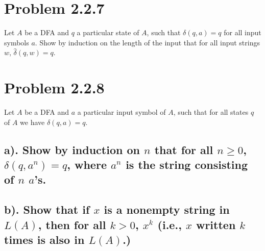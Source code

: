 \documentclass[20pt]{article} %
\begin{document}
\section{Problem 2.2.7}
Let $A$ be a DFA and $q$ a particular state of $A$, such that $\delta(q,a)=q$ for all input symbols $a$. 
Show by induction on the length of the input that for all input strings $w$, $\hat{\delta}(q,w)=q$.

\section{Problem 2.2.8}
Let $A$ be a DFA and $a$ a particular input symbol of $A$, such that for all states $q$ of $A$ we have $\delta(q,a)=q$.

\subsection{a). Show by induction on $n$ that for all $n\geq0$, $\delta(q,a^{n})=q$, where $a^{n}$ is the string consisting of $n$ $a$'s.}

\subsection{b). Show that if $x$ is a nonempty string in $L(A)$, then for all $k>0$, $x^{k}$ (i.e., $x$ written $k$ times is also in $L(A)$.)}
\end{document}
